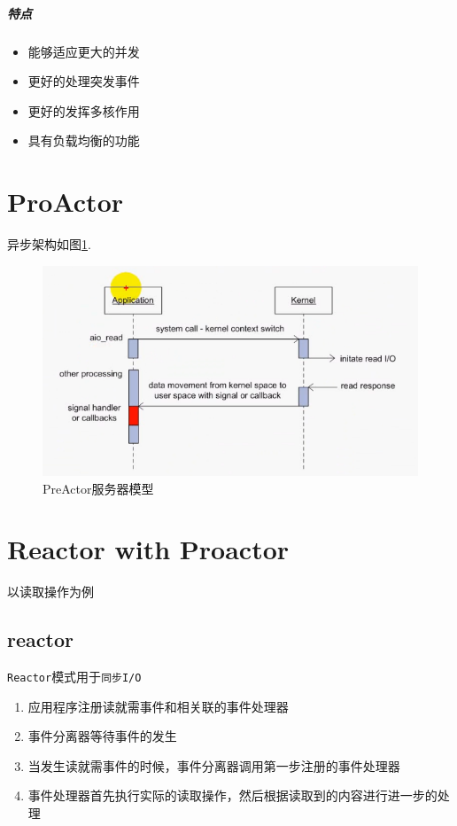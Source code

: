 \documentclass[UTF8,a4paper,12pt]{ctexbook}
\begin{document}
		\subparagraph{特点}
		\begin{itemize}
			\item 能够适应更大的并发
			\item 更好的处理突发事件
			\item 更好的发挥多核作用
			\item 具有负载均衡的功能
		\end{itemize}
		
	\newpage
	\section{ProActor}
		异步架构如图\ref{PreActor}.
				
				\begin{figure}[htbp]
					\centering
					\includegraphics[scale = 0.8]{figures/PreActor.png}
					\caption{PreActor服务器模型}
					\label{PreActor}
				\end{figure}
	
	\newpage
	\section{Reactor with Proactor}
		以读取操作为例
		
		\subsection{reactor}
			\verb|Reactor|模式用于\verb|同步I/O|
			
			\begin{enumerate}
				\item 应用程序注册读就需事件和相关联的事件处理器
				\item 事件分离器等待事件的发生
				\item 当发生读就需事件的时候，事件分离器调用第一步注册的事件处理器
				\item 事件处理器首先执行实际的读取操作，然后根据读取到的内容进行进一步的处理
			\end{enumerate}
		
\end{document}
